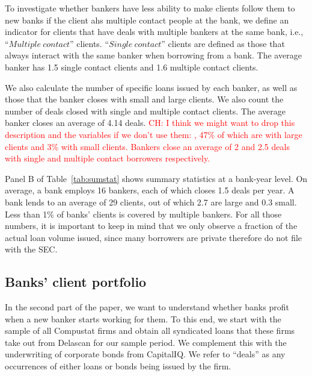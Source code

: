 To investigate whether bankers have less ability to make clients follow them to new banks if the client ahs multiple contact people at the bank, we define an indicator for clients that have deals with multiple bankers at the same bank, i.e., ``$Multiple~contact$'' clients. ``$Single~contact$'' clients are defined as those that always interact with the same banker when borrowing from a bank. The average banker has 1.5 single contact clients and 1.6 multiple contact clients. 

We also calculate the number of specific loans issued by each banker, as well as those that the banker closes with small and large clients. We also count the number of deals closed with single and multiple contact clients. The average banker closes an average of 4.14 deals. \textcolor{red}{CH: I think we might want to drop this description and the variables if we don't use them: , 47\% of which are with large clients and 3\% with small clients. Bankers close an average of 2 and 2.5 deals with single and multiple contact borrowers respectively.}

Panel B of Table~\ref{tab:sumstat} shows summary statistics at a bank-year level. On average, a bank employs 16 bankers, each of which closes 1.5 deals per year. A bank lends to an average of 29 clients, out of which 2.7 are large and 0.3 small. Less than 1\% of banks' clients is covered by multiple bankers. For all those numbers, it is important to keep in mind that we only observe a fraction of the actual loan volume issued, since many borrowers are private therefore do not file with the SEC. 


\subsection{Banks' client portfolio}

In the second part of the paper, we want to understand whether banks profit when a new banker starts working for them. To this end, we start with the sample of all Compustat firms and obtain all syndicated loans that these firms take out from Delascan for our sample period. We complement this with the underwriting of corporate bonds 
from CapitalIQ. We refer to ``deals'' as any occurrences of either loans or bonds being issued by the firm. %

